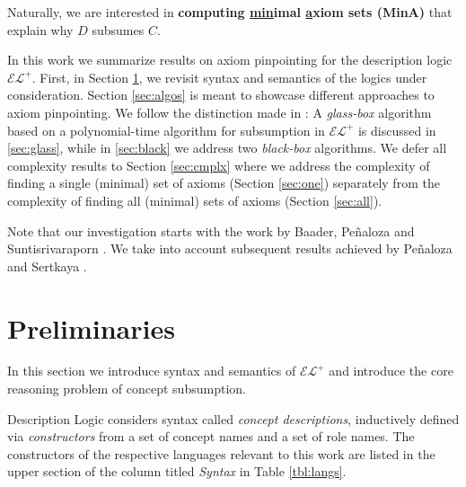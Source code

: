 \documentclass{llncs}
\newcommand{\elp}{\ensuremath{\mathcal{EL^+}}\xspace}
\begin{document}
Naturally, we are interested in \textbf{computing \underline{min}imal \underline{a}xiom sets (MinA)} that explain why $D$ subsumes $C$.

In this work we summarize results on axiom pinpointing for the description logic \elp. First, in Section \ref{sec:prelim}, we revisit syntax and semantics of the logics under consideration. Section \ref{sec:algos} is meant to showcase different approaches to axiom pinpointing. We follow the distinction made in \cite[Section 1]{family}: A \emph{glass-box} algorithm based on a polynomial-time algorithm for subsumption in \elp is discussed in \ref{sec:glass}, while in \ref{sec:black} we address two \emph{black-box} algorithms. We defer all complexity results to Section \ref{sec:cmplx} where we address the complexity of finding a single (minimal) set of axioms (Section \ref{sec:one}) separately from the complexity of finding all (minimal) sets of axioms (Section \ref{sec:all}).

Note that our investigation starts with the work by Baader, Pe{\~{n}}aloza and Suntisrivaraporn \cite{orig1,orig2}. We take into account subsequent results achieved by Pe{\~{n}}aloza and Sertkaya \cite{hard,family}.

\section{Preliminaries}
\label{sec:prelim}

In this section we introduce syntax and semantics of \elp and introduce the core reasoning problem of concept subsumption.

Description Logic considers syntax called \emph{concept descriptions}, inductively defined via \emph{constructors} from a set of concept names and a set of role names. The constructors of the respective languages relevant to this work are listed in the upper section of the column titled \emph{Syntax} in Table \ref{tbl:langs}.
\end{document}
